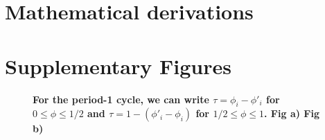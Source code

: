 \setcounter{equation}{0}
\setcounter{figure}{0}
\setcounter{table}{0}
\setcounter{page}{1}
\makeatletter
\renewcommand{\thefigure}{S\arabic{figure}}

\section{Mathematical derivations}


\section{Supplementary Figures}

\begin{figure}[tbph]
    \medskip
    \caption{\textbf{For the period-1 cycle, we can write $\tau = \phi_i - \phi'_i$ for $0\leq \phi \leq1/2$ and $\tau = 1-(\phi'_i - \phi_i)$ for $1/2\leq \phi \leq1$. Fig a) Fig b)}}
    \label{sines}
\end{figure}


